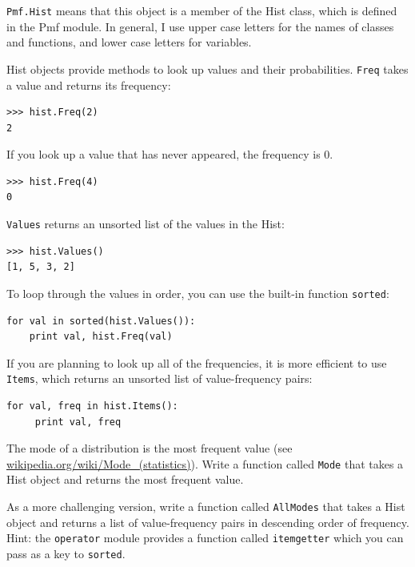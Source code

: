 \documentclass[12pt]{book}
\begin{document}
{\tt Pmf.Hist} means that this object is a member of the Hist class,
which is defined in the Pmf module.  In general, I use upper case
letters for the names of classes and functions, and lower case letters
for variables.

Hist objects provide methods to look up values and their
probabilities.  {\tt Freq} takes a value and returns its frequency:

\begin{verbatim}
>>> hist.Freq(2)
2
\end{verbatim}

If you look up a value that has never appeared, the frequency is 0.

\begin{verbatim}
>>> hist.Freq(4)
0
\end{verbatim}

{\tt Values} returns an unsorted list of the values in the Hist:

\begin{verbatim}
>>> hist.Values()
[1, 5, 3, 2]
\end{verbatim}

To loop through the values in order, you can use the built-in function
{\tt sorted}:

\begin{verbatim}
for val in sorted(hist.Values()):
    print val, hist.Freq(val)
\end{verbatim}

If you are planning to look up all of the frequencies, it is more
efficient to use {\tt Items}, which returns an unsorted list of
value-frequency pairs:

\begin{verbatim}
for val, freq in hist.Items():
     print val, freq
\end{verbatim}

\begin{ex}

The mode of a distribution is the most frequent value (see
\url{wikipedia.org/wiki/Mode_(statistics)}).  Write a function called
    {\tt Mode} that takes a Hist object and returns the most frequent
    value.


As a more challenging version, write a function called {\tt AllModes}
that takes a Hist object and returns a list of value-frequency
pairs in descending order of frequency.  Hint: the {\tt operator}
module provides a function called {\tt itemgetter} which you can
pass as a key to {\tt sorted}.

\end{ex}
\end{document}
